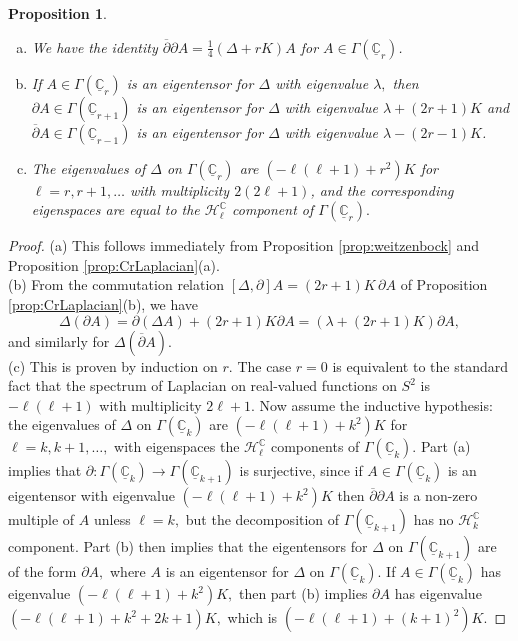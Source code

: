 \documentclass[11pt]{article}
\newcommand{\C}{\mathbb{C}}
\newcommand{\uC}{\underline{\mathbb{C}}}
\newtheorem{prop}[thm]{Proposition}
\theoremstyle{definition}
\numberwithin{equation}{section}
\begin{document}
\begin{prop} \label{cor:evectshifting} ${}$
\begin{enumerate}[(a)]
\item We have the identity $\overline{\partial} \partial A = \tfrac{1}{4} \left( \Delta + r K \right) A$ for $A \in \Gamma(\uC_r)$.
\item    If $A \in \Gamma(\uC_r)$ is an eigentensor for $\Delta$ with eigenvalue $\lambda,$ then $\partial A \in \Gamma(\uC_{r+1})$ is an eigentensor for $\Delta$ with eigenvalue $\lambda + (2r + 1) K$ and $\overline{\partial} A \in \Gamma(\uC_{r-1})$ is an eigentensor for $\Delta$ with eigenvalue $\lambda - (2 r - 1) K$.
\item The eigenvalues of $\Delta$ on $\Gamma(\uC_r)$ are $\left(-\ell(\ell+1) + r^2 \right) K$ for $\ell = r, r+1, \ldots$ with multiplicity $2\left(2 \ell + 1 \right)$, and the corresponding eigenspaces are equal to the $\mathcal{H}^{\C}_\ell$ component of $\Gamma(\uC_r).$
\end{enumerate}
\end{prop}

\begin{proof} \indent (a) This follows immediately from Proposition \ref{prop:weitzenbock} and Proposition \ref{prop:CrLaplacian}(a).
 \\
 
 (b) From the commutation relation $[\Delta, \partial] A = (2r+1) K\, \partial A$ of Proposition \ref{prop:CrLaplacian}(b), we have
    \begin{equation*}
        \Delta ( \partial A ) = \partial ( \Delta A) + (2r+1) K \partial A = \left( \lambda + (2 r + 1) K \right) \partial A,
    \end{equation*}
    and similarly for $\Delta(\overline{\partial} A)$. \\

\indent (c) This is proven by induction on $r.$ The case $r= 0$ is equivalent to the standard fact that the spectrum of Laplacian on real-valued functions on $S^2$ is $-\ell(\ell+1)$ with multiplicity $2 \ell+1.$ Now assume the inductive hypothesis: the eigenvalues of $\Delta$ on $\Gamma(\uC_k)$ are $\left(-\ell(\ell+1) + k^2 \right) K$ for $\ell = k, k+1, \ldots,$ with eigenspaces the $\mathcal{H}^{\C}_\ell$ components of $\Gamma(\uC_k).$ Part (a) implies that $\partial : \Gamma(\underline{\mathbb{C}}_k) \to \Gamma(\underline{\mathbb{C}}_{k+1})$ is surjective, since if $A \in \Gamma(\underline{\mathbb{C}}_k)$ is an eigentensor with eigenvalue $\left(-\ell(\ell+1) + k^2 \right) K$ then $\overline{\partial} \partial A$ is a non-zero multiple of $A$ unless $\ell = k,$ but the decomposition of $\Gamma(\uC_{k+1})$ has no $\mathcal{H}_{k}^\C$ component. Part (b) then implies that the eigentensors for $\Delta$ on $\Gamma(\uC_{k+1})$ are of the form $\partial A,$ where $A$ is an eigentensor for $\Delta$ on $\Gamma(\uC_k).$ If $A \in \Gamma(\uC_k)$ has eigenvalue $\left(-\ell(\ell+1) + k^2 \right)K,$ then part (b) implies $\partial A$ has eigenvalue $\left(-\ell(\ell+1) + k^2 + 2k+1 \right)K,$ which is $\left(-\ell(\ell+1) + (k+1)^2 \right)K.$  
\end{proof}
\end{document}
